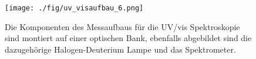 \begin{figure}
    \centering
    \texttt{[image: ./fig/uv\_visaufbau\_6.png]}
    \caption{Die Komponenten des Messaufbaus für die UV/vis Spektroskopie sind montiert auf einer optischen Bank, ebenfalls abgebildet sind die dazugehörige Halogen-Deuterium Lampe und das Spektrometer.}
    \label{fig:uv_visaufbau}
\end{figure}
